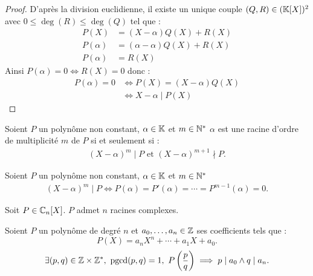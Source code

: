 \begin{proof}
	D'après la division euclidienne, il existe un unique couple $(Q, R) \in (\mathbb{K}[X])^2$ avec $0 \leq \deg(R) \leq \deg(Q)$ tel que :
	\begin{align*}
		P(X) &= (X - \alpha) Q(X) + R(X) \\
		P(\alpha) &= (\alpha - \alpha) Q(X) + R(X) \\
		P(\alpha) &= R(X)
	\end{align*}
	Ainsi $P(\alpha) = 0 \iff R(X) = 0$ donc :
	\begin{align*}
		P(\alpha) = 0 &\iff P(X) = (X - \alpha) Q(X) \\
					  &\iff X - \alpha \mid P(X)
	\end{align*}
\end{proof}

\begin{definition}\label{def:ordre_mult}
	Soient $P$ un polynôme non constant, $\alpha \in \mathbb{K}$ et $m \in \mathbb{N}^*$ $\alpha$ est une racine d'ordre de multiplicité $m$ de $P$ si et seulement si :
	\begin{align*}
		(X - \alpha)^m \mid P \text{ et } (X - \alpha)^{m+1} \nmid P.
	\end{align*}
\end{definition}

\begin{theorem}
	Soient $P$ un polynôme non constant, $\alpha \in \mathbb{K}$ et $m \in \mathbb{N}^*$
	\begin{align*}
		(X - \alpha)^m \mid P \iff P(\alpha) = P'(\alpha) = \cdots = P^{m-1}(\alpha) = 0.
	\end{align*}
\end{theorem}

\begin{theorem}
	Soit $P \in \mathbb{C}_n[X]$. $P$ admet $n$ racines complexes. 
\end{theorem}

\begin{theorem}
	Soient $P$ un polynôme de degré $n$ et $a_0, \ldots, a_n \in \mathbb{Z}$ ses coefficients tels que :
	\[ P(X) = a_n X^n + \cdots + a_1 X + a_0. \]
	\[ \exists (p, q) \in \Z \times \Z^*,\ \pgcd(p, q) = 1,\ P\left( \frac{p}{q} \right) \implies p \mid a_0 \land q \mid a_n. \]
\end{theorem}

